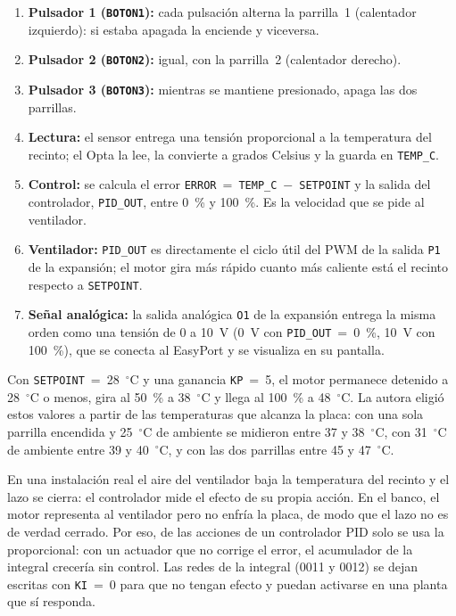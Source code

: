 \documentclass[12pt,a4paper]{article}
\begin{document}
\begin{enumerate}
    \item \textbf{Pulsador 1 (\texttt{BOTON1}):} cada pulsación alterna la
    parrilla~1 (calentador izquierdo): si estaba apagada la enciende y
    viceversa.
    \item \textbf{Pulsador 2 (\texttt{BOTON2}):} igual, con la parrilla~2
    (calentador derecho).
    \item \textbf{Pulsador 3 (\texttt{BOTON3}):} mientras se mantiene
    presionado, apaga las dos parrillas.
    \item \textbf{Lectura:} el sensor entrega una tensión proporcional a la
    temperatura del recinto; el Opta la lee, la convierte a grados Celsius
    y la guarda en \texttt{TEMP\_C}.
    \item \textbf{Control:} se calcula el error
    \texttt{ERROR}~=~\texttt{TEMP\_C}~$-$~\texttt{SETPOINT} y la salida del
    controlador, \texttt{PID\_OUT}, entre 0~\% y 100~\%. Es la velocidad
    que se pide al ventilador.
    \item \textbf{Ventilador:} \texttt{PID\_OUT} es directamente el ciclo
    útil del PWM de la salida \texttt{P1} de la expansión; el motor gira
    más rápido cuanto más caliente está el recinto respecto a
    \texttt{SETPOINT}.
    \item \textbf{Señal analógica:} la salida analógica \texttt{O1}
    de la expansión entrega la misma orden como una tensión de 0 a 10~V
    (0~V con \texttt{PID\_OUT}~=~0~\%, 10~V con 100~\%), que se conecta al
    EasyPort y se visualiza en su pantalla.
\end{enumerate}

Con \texttt{SETPOINT}~=~28~$^\circ$C y una ganancia \texttt{KP}~=~5, el
motor permanece detenido a 28~$^\circ$C o menos, gira al 50~\% a
38~$^\circ$C y llega al 100~\% a 48~$^\circ$C. La autora eligió estos valores a partir
de las temperaturas que alcanza la placa: con una sola parrilla encendida
y 25~$^\circ$C de ambiente se midieron entre 37 y 38~$^\circ$C, con
31~$^\circ$C de ambiente entre 39 y 40~$^\circ$C, y con las dos parrillas
entre 45 y 47~$^\circ$C.

\begin{nota}
En una instalación real el aire del ventilador baja la temperatura del
recinto y el lazo se cierra: el controlador mide el efecto de su propia
acción. En el banco, el motor representa al ventilador pero no enfría la
placa, de modo que el lazo no es de verdad cerrado. Por eso, de las
acciones de un controlador PID solo se usa la proporcional: con un
actuador que no corrige el error, el acumulador de la integral crecería
sin control. Las redes de la integral (0011 y 0012) se dejan escritas con
\texttt{KI}~=~0 para que no tengan efecto y puedan activarse en una planta
que sí responda.
\end{nota}
\end{document}
